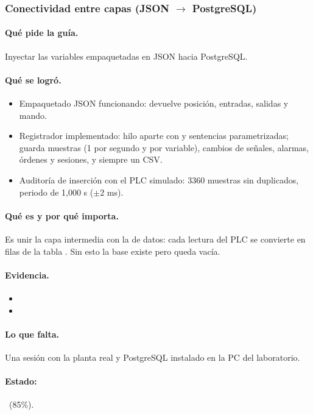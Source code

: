 \documentclass[a4paper,11pt]{article}
\begin{document}
\subsubsection{Conectividad entre capas (JSON $\to$ PostgreSQL)}
\paragraph{Qué pide la guía.} Inyectar las variables empaquetadas en JSON hacia PostgreSQL.
\paragraph{Qué se logró.}
\begin{itemize}
\item Empaquetado JSON funcionando:  devuelve posición, entradas, salidas y mando.
\item Registrador  implementado: hilo aparte con  y sentencias parametrizadas; guarda muestras (1 por segundo y por variable), cambios de señales, alarmas, órdenes y sesiones, y siempre un CSV.
\item Auditoría de inserción con el PLC simulado: 3360 muestras sin duplicados, periodo de 1,000 s ($\pm$2 ms).
\end{itemize}
\paragraph{Qué es y por qué importa.} Es unir la capa intermedia con la de datos: cada lectura del PLC se convierte en filas de la tabla . Sin esto la base existe pero queda vacía.
\paragraph{Evidencia.}
\begin{itemize}\small
\item {}
\item {}
\end{itemize}
\paragraph{Lo que falta.} Una sesión con la planta real y PostgreSQL instalado en la PC del laboratorio.
\paragraph{Estado:} \parcial~(85\%).
\end{document}
